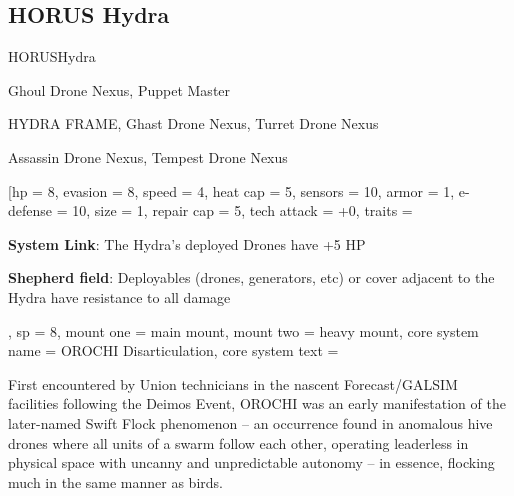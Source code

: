 \subsection{HORUS Hydra}

\begin{mech}{HORUS}{Hydra}


\begin{license}
\item Ghoul Drone Nexus, Puppet Master
\item HYDRA FRAME, Ghast Drone Nexus, Turret Drone Nexus
\item Assassin Drone Nexus, Tempest Drone Nexus
\end{license}


\frameBox
[hp = 8,
evasion = 8,
speed = 4,
heat cap = 5,
sensors = 10,
armor = 1,
e-defense = 10,
size = 1,
repair cap = 5,
tech attack = +0,
traits = {\textbf{System Link}: The Hydra's deployed Drones have +5 HP

\textbf{Shepherd field}: Deployables (drones, generators, etc) or cover adjacent to the Hydra have resistance to all damage},
sp = 8,
mount one = main mount,
mount two = heavy mount,
core system name = OROCHI Disarticulation,
core system text = {First encountered by Union technicians in the nascent Forecast/GALSIM facilities following the Deimos Event, OROCHI was an early manifestation of the later-named Swift Flock phenomenon -- an occurrence found in anomalous hive drones where all units of a swarm follow each other, operating leaderless in physical space with uncanny and unpredictable autonomy -- in essence, flocking much in the same manner as birds.

}
\end{mech}
